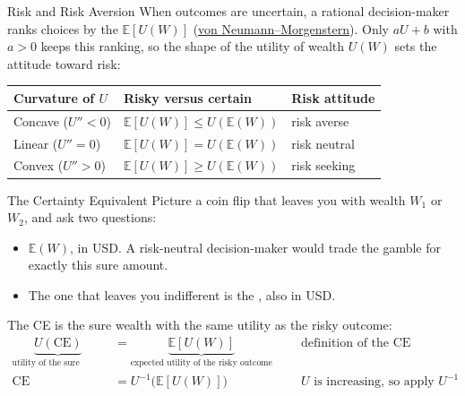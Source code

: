 \documentclass[aspectratio=169,11pt]{beamer}
\newcommand{\E}{\mathbb{E}}
\newcommand{\CE}{\mathrm{CE}}
\begin{document}
\begin{frame}{Risk and Risk Aversion}
  When outcomes are uncertain, a rational decision-maker ranks choices by the
   $\E[U(W)]$
  (\href{https://en.wikipedia.org/wiki/Von_Neumann\%E2\%80\%93Morgenstern_utility_theorem}{von Neumann--Morgenstern}).
  Only $aU+b$ with $a>0$ keeps this ranking, so the shape of the utility of wealth
  $U(W)$ sets the attitude toward risk:

  \vspace{0.5em}
  \begin{center}
  {\small
  \begin{tabular}{@{}lll@{}}
    \toprule
    \textbf{Curvature of $U$} & \textbf{Risky versus certain} & \textbf{Risk attitude}\\
    \midrule
    Concave ($U''<0$) & $\E[U(W)]\le U(\E(W))$ & risk averse\\
    Linear ($U''=0$) & $\E[U(W)]=U(\E(W))$ & risk neutral\\
    Convex ($U''>0$) & $\E[U(W)]\ge U(\E(W))$ & risk seeking\\
    \bottomrule
  \end{tabular}}
  \end{center}

\end{frame}

\begin{frame}{The Certainty Equivalent}
  Picture a coin flip that leaves you with wealth $W_1$ or $W_2$, and ask two questions:
  \begin{itemize}\setlength{\itemsep}{0.3em}
    \item {} $\E(W)$, in USD. A risk-neutral
      decision-maker would trade the gamble for exactly this sure amount.
    \item {} The one that leaves you
      indifferent is the , also in USD.
  \end{itemize}
  The CE is the sure wealth with the same utility as the risky outcome:
  \[
    \begin{aligned}
      \underbrace{U(\CE)}_{\text{utility of the sure wealth}}&=\underbrace{\E[U(W)]}_{\text{expected utility of the risky outcome}} &&\quad\text{definition of the CE}\\
      \CE&=U^{-1}\bigl(\E[U(W)]\bigr) &&\quad U\text{ is increasing, so apply }U^{-1}
    \end{aligned}
  \]
\end{frame}
\end{document}
